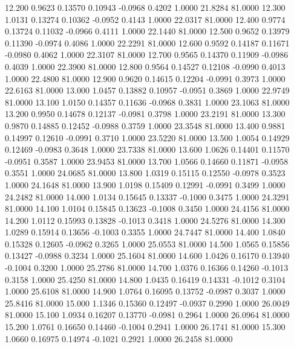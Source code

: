   12.200   0.9623   0.13570   0.10943  -0.0968   0.4202   1.0000  21.8284  81.0000
  12.300   1.0131   0.13274   0.10362  -0.0952   0.4143   1.0000  22.0317  81.0000
  12.400   0.9774   0.13724   0.11032  -0.0966   0.4111   1.0000  22.1440  81.0000
  12.500   0.9652   0.13979   0.11390  -0.0974   0.4086   1.0000  22.2291  81.0000
  12.600   0.9592   0.14187   0.11671  -0.0980   0.4062   1.0000  22.3107  81.0000
  12.700   0.9565   0.14370   0.11909  -0.0986   0.4039   1.0000  22.3900  81.0000
  12.800   0.9564   0.14527   0.12108  -0.0990   0.4013   1.0000  22.4800  81.0000
  12.900   0.9620   0.14615   0.12204  -0.0991   0.3973   1.0000  22.6163  81.0000
  13.000   1.0457   0.13882   0.10957  -0.0951   0.3869   1.0000  22.9749  81.0000
  13.100   1.0150   0.14357   0.11636  -0.0968   0.3831   1.0000  23.1063  81.0000
  13.200   0.9950   0.14678   0.12137  -0.0981   0.3798   1.0000  23.2191  81.0000
  13.300   0.9870   0.14885   0.12452  -0.0988   0.3759   1.0000  23.3548  81.0000
  13.400   0.9881   0.14997   0.12610  -0.0991   0.3710   1.0000  23.5220  81.0000
  13.500   1.0054   0.14929   0.12469  -0.0983   0.3648   1.0000  23.7338  81.0000
  13.600   1.0626   0.14401   0.11570  -0.0951   0.3587   1.0000  23.9453  81.0000
  13.700   1.0566   0.14660   0.11871  -0.0958   0.3551   1.0000  24.0685  81.0000
  13.800   1.0319   0.15115   0.12550  -0.0978   0.3523   1.0000  24.1648  81.0000
  13.900   1.0198   0.15409   0.12991  -0.0991   0.3499   1.0000  24.2482  81.0000
  14.000   1.0134   0.15645   0.13337  -0.1000   0.3475   1.0000  24.3291  81.0000
  14.100   1.0104   0.15845   0.13623  -0.1008   0.3450   1.0000  24.4156  81.0000
  14.200   1.0112   0.15993   0.13828  -0.1013   0.3418   1.0000  24.5276  81.0000
  14.300   1.0289   0.15914   0.13656  -0.1003   0.3355   1.0000  24.7447  81.0000
  14.400   1.0840   0.15328   0.12605  -0.0962   0.3265   1.0000  25.0553  81.0000
  14.500   1.0565   0.15856   0.13427  -0.0988   0.3234   1.0000  25.1604  81.0000
  14.600   1.0426   0.16170   0.13940  -0.1004   0.3200   1.0000  25.2786  81.0000
  14.700   1.0376   0.16366   0.14260  -0.1013   0.3158   1.0000  25.4250  81.0000
  14.800   1.0435   0.16419   0.14331  -0.1012   0.3104   1.0000  25.6108  81.0000
  14.900   1.0764   0.16095   0.13752  -0.0987   0.3037   1.0000  25.8416  81.0000
  15.000   1.1346   0.15360   0.12497  -0.0937   0.2990   1.0000  26.0049  81.0000
  15.100   1.0934   0.16207   0.13770  -0.0981   0.2964   1.0000  26.0964  81.0000
  15.200   1.0761   0.16650   0.14460  -0.1004   0.2941   1.0000  26.1741  81.0000
  15.300   1.0660   0.16975   0.14974  -0.1021   0.2921   1.0000  26.2458  81.0000
